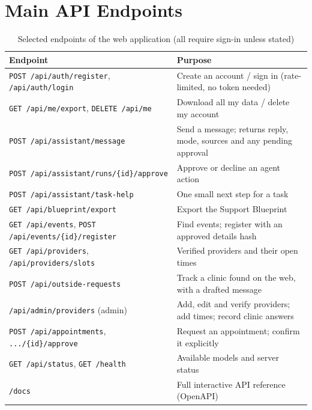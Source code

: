 \documentclass[11pt,a4paper]{article}
\newcommand{\code}[1]{\texttt{#1}}
\begin{document}
\section{Main API Endpoints}\label{app:api}
\begin{table}[H]
\centering
\caption{Selected endpoints of the web application (all require sign-in unless stated)}
\label{tab:api}
\small
\begin{tabularx}{\textwidth}{@{}lY@{}}
\toprule
\textbf{Endpoint} & \textbf{Purpose}\\
\midrule
\code{POST /api/auth/register}, \code{/api/auth/login} & Create an account / sign in (rate-limited, no token needed)\\
\code{GET /api/me/export}, \code{DELETE /api/me} & Download all my data / delete my account\\
\code{POST /api/assistant/message} & Send a message; returns reply, mode, sources and any pending approval\\
\code{POST /api/assistant/runs/\{id\}/approve} & Approve or decline an agent action\\
\code{POST /api/assistant/task-help} & One small next step for a task\\
\code{GET /api/blueprint/export} & Export the Support Blueprint\\
\code{GET /api/events}, \code{POST /api/events/\{id\}/register} & Find events; register with an approved details hash\\
\code{GET /api/providers}, \code{/api/providers/slots} & Verified providers and their open times\\
\code{POST /api/outside-requests} & Track a clinic found on the web, with a drafted message\\
\code{/api/admin/providers} (admin) & Add, edit and verify providers; add times; record clinic answers\\
\code{POST /api/appointments}, \code{.../\{id\}/approve} & Request an appointment; confirm it explicitly\\
\code{GET /api/status}, \code{GET /health} & Available models and server status\\
\code{/docs} & Full interactive API reference (OpenAPI)\\
\bottomrule
\end{tabularx}
\end{table}
\end{document}
